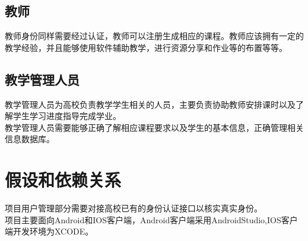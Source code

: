 \subsection{教师}
教师身份同样需要经过认证，教师可以注册生成相应的课程。教师应该拥有一定的教学经验，并且能够使用软件辅助教学，进行资源分享和作业等的布置等等。
\subsection{教学管理人员}
教学管理人员为高校负责教学学生相关的人员，主要负责协助教师安排课时以及了解学生学习进度指导完成学业。\\
教学管理人员需要能够正确了解相应课程要求以及学生的基本信息，正确管理相关信息数据库。

\section{假设和依赖关系}
项目用户管理部分需要对接高校已有的身份认证接口以核实真实身份。\\
项目主要面向Android和IOS客户端，Android客户端采用AndroidStudio,IOS客户端开发环境为XCODE。\\
